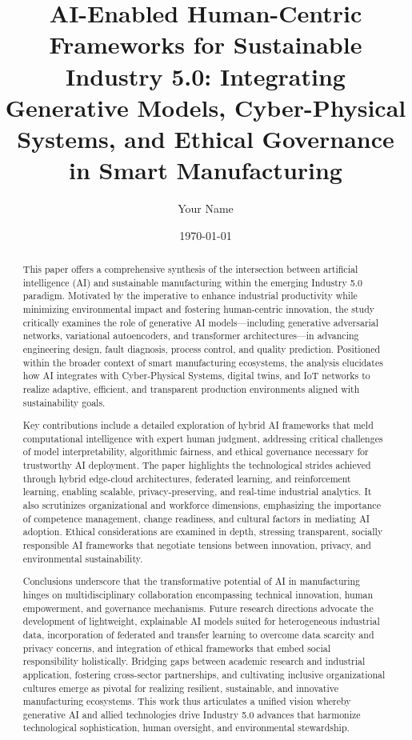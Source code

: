 \documentclass[11pt]{article}
\begin{document}
\author{Your Name}
\date{\today}

\title{\title{AI-Enabled Human-Centric Frameworks for Sustainable Industry 5.0: Integrating Generative Models, Cyber-Physical Systems, and Ethical Governance in Smart Manufacturing}}
\maketitle

\begin{abstract}
This paper offers a comprehensive synthesis of the intersection between artificial intelligence (AI) and sustainable manufacturing within the emerging Industry 5.0 paradigm. Motivated by the imperative to enhance industrial productivity while minimizing environmental impact and fostering human-centric innovation, the study critically examines the role of generative AI models—including generative adversarial networks, variational autoencoders, and transformer architectures—in advancing engineering design, fault diagnosis, process control, and quality prediction. Positioned within the broader context of smart manufacturing ecosystems, the analysis elucidates how AI integrates with Cyber-Physical Systems, digital twins, and IoT networks to realize adaptive, efficient, and transparent production environments aligned with sustainability goals.

Key contributions include a detailed exploration of hybrid AI frameworks that meld computational intelligence with expert human judgment, addressing critical challenges of model interpretability, algorithmic fairness, and ethical governance necessary for trustworthy AI deployment. The paper highlights the technological strides achieved through hybrid edge-cloud architectures, federated learning, and reinforcement learning, enabling scalable, privacy-preserving, and real-time industrial analytics. It also scrutinizes organizational and workforce dimensions, emphasizing the importance of competence management, change readiness, and cultural factors in mediating AI adoption. Ethical considerations are examined in depth, stressing transparent, socially responsible AI frameworks that negotiate tensions between innovation, privacy, and environmental sustainability.

Conclusions underscore that the transformative potential of AI in manufacturing hinges on multidisciplinary collaboration encompassing technical innovation, human empowerment, and governance mechanisms. Future research directions advocate the development of lightweight, explainable AI models suited for heterogeneous industrial data, incorporation of federated and transfer learning to overcome data scarcity and privacy concerns, and integration of ethical frameworks that embed social responsibility holistically. Bridging gaps between academic research and industrial application, fostering cross-sector partnerships, and cultivating inclusive organizational cultures emerge as pivotal for realizing resilient, sustainable, and innovative manufacturing ecosystems. This work thus articulates a unified vision whereby generative AI and allied technologies drive Industry 5.0 advances that harmonize technological sophistication, human oversight, and environmental stewardship.


\end{abstract}
\end{document}

